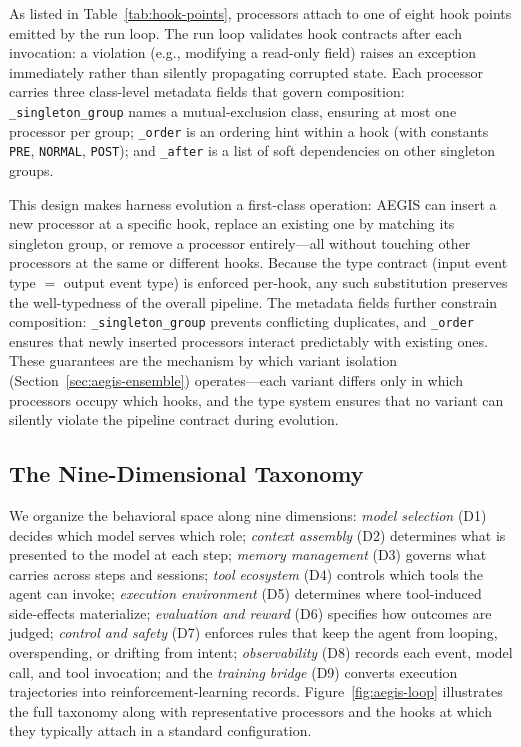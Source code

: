 As listed in Table~\ref{tab:hook-points}, processors attach to one of eight hook points emitted by the run loop. The run loop validates hook contracts after each invocation: a violation (e.g., modifying a read-only field) raises an exception immediately rather than silently propagating corrupted state. Each processor carries three class-level metadata fields that govern composition: \texttt{\_singleton\_group} names a mutual-exclusion class, ensuring at most one processor per group; \texttt{\_order} is an ordering hint within a hook (with constants \texttt{PRE}, \texttt{NORMAL}, \texttt{POST}); and \texttt{\_after} is a list of soft dependencies on other singleton groups.

This design makes harness evolution a first-class operation: AEGIS can insert a new processor at a specific hook, replace an existing one by matching its singleton group, or remove a processor entirely---all without touching other processors at the same or different hooks. Because the type contract (input event type $=$ output event type) is enforced per-hook, any such substitution preserves the well-typedness of the overall pipeline. The metadata fields further constrain composition: \texttt{\_singleton\_group} prevents conflicting duplicates, and \texttt{\_order} ensures that newly inserted processors interact predictably with existing ones. These guarantees are the mechanism by which variant isolation (Section~\ref{sec:aegis-ensemble}) operates---each variant differs only in which processors occupy which hooks, and the type system ensures that no variant can silently violate the pipeline contract during evolution.

\subsection{The Nine-Dimensional Taxonomy}
\label{sec:foundry-taxonomy}

We organize the behavioral space along nine dimensions: \textit{model selection} (D1) decides which model serves which role; \textit{context assembly} (D2) determines what is presented to the model at each step; \textit{memory management} (D3) governs what carries across steps and sessions; \textit{tool ecosystem} (D4) controls which tools the agent can invoke; \textit{execution environment} (D5) determines where tool-induced side-effects materialize; \textit{evaluation and reward} (D6) specifies how outcomes are judged; \textit{control and safety} (D7) enforces rules that keep the agent from looping, overspending, or drifting from intent; \textit{observability} (D8) records each event, model call, and tool invocation; and the \textit{training bridge} (D9) converts execution trajectories into reinforcement-learning records. Figure~\ref{fig:aegis-loop} illustrates the full taxonomy along with representative processors and the hooks at which they typically attach in a standard configuration.


